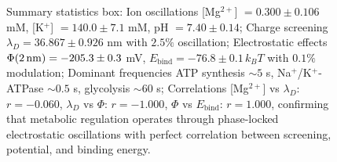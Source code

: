 \begin{figure}[htbp]
{Summary statistics box: Ion oscillations [Mg$^{2+}$] $= 0.300 \pm 0.106$ mM, [K$^+$] $= 140.0 \pm 7.1$ mM, pH $= 7.40 \pm 0.14$; Charge screening $\lambda_D = 36.867 \pm 0.926$ nm with $2.5\%$ oscillation; Electrostatic effects $\Phi(2\,{\rm nm}) = -205.3 \pm 0.3$ mV, $E_{\text{bind}} = -76.8 \pm 0.1\, k_B T$ with $0.1\%$ modulation; Dominant frequencies ATP synthesis $\sim 5$ s, Na$^+$/K$^+$-ATPase $\sim 0.5$ s, glycolysis $\sim 60$ s; Correlations [Mg$^{2+}$] vs $\lambda_D$: $r = -0.060$, $\lambda_D$ vs $\Phi$: $r = -1.000$, $\Phi$ vs $E_{\text{bind}}$: $r = 1.000$, confirming that metabolic regulation operates through phase-locked electrostatic oscillations with perfect correlation between screening, potential, and binding energy.}
\label{fig:metabolic_oscillations}
\end{figure}

